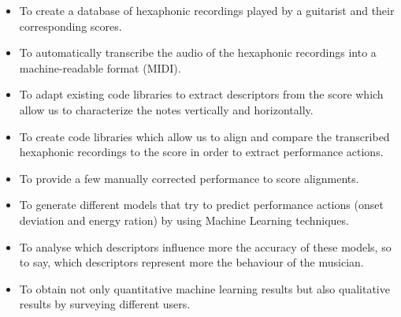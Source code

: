 \begin{itemize}[noitemsep]
\item To create a database of hexaphonic recordings played by a guitarist and their corresponding scores.
\item To automatically transcribe the audio of the hexaphonic recordings into a machine-readable format (MIDI).
\item To adapt existing code libraries to extract descriptors from the score which allow us to characterize the notes vertically and horizontally.
\item To create code libraries which allow us to align and compare the transcribed hexaphonic recordings to the score in order to extract performance actions.
\item To provide a few manually corrected performance to score alignments.
\item To generate different models that try to predict performance actions (onset deviation and energy ration) by using Machine Learning techniques.
\item To analyse which descriptors influence more the accuracy of these models, so to say, which descriptors represent more the behaviour of the musician.
\item To obtain not only quantitative machine learning results but also qualitative results by surveying different users.
\end{itemize}

\cleardoublepage

